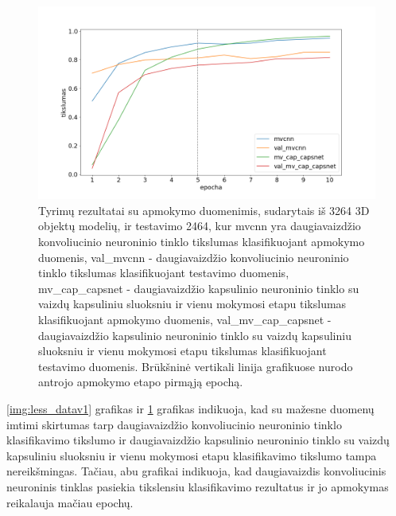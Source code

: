 \begin{figure}[H]
	\centering
	\includegraphics[scale=0.5]{img/less_data_v2.png}
	\caption{
		Tyrimų rezultatai su apmokymo duomenimis, sudarytais iš 3264 3D objektų modelių, ir testavimo 2464, kur mvcnn yra daugiavaizdžio konvoliucinio neuroninio tinklo tikslumas klasifikuojant apmokymo duomenis, val\_mvcnn - daugiavaizdžio konvoliucinio neuroninio tinklo tikslumas klasifikuojant testavimo duomenis, mv\_cap\_capsnet - daugiavaizdžio kapsulinio neuroninio tinklo su vaizdų kapsuliniu sluoksniu ir vienu mokymosi etapu tikslumas klasifikuojant apmokymo duomenis, val\_mv\_cap\_capsnet - daugiavaizdžio kapsulinio neuroninio tinklo su vaizdų kapsuliniu sluoksniu ir vienu mokymosi etapu tikslumas klasifikuojant testavimo duomenis.	Brūkšninė vertikali linija grafikuose nurodo antrojo apmokymo etapo pirmąją epochą.
	}
	\label{img:less_datav2}
\end{figure}

\ref{img:less_datav1} grafikas ir \ref{img:less_datav2} grafikas indikuoja, kad su mažesne duomenų imtimi skirtumas tarp daugiavaizdžio konvoliucinio neuroninio tinklo klasifikavimo tikslumo ir daugiavaizdžio kapsulinio neuroninio tinklo su vaizdų kapsuliniu sluoksniu ir vienu mokymosi etapu klasifikavimo tikslumo tampa nereikšmingas. Tačiau, abu grafikai indikuoja, kad  daugiavaizdis konvoliucinis neuroninis tinklas pasiekia tikslensiu klasifikavimo rezultatus ir jo apmokymas reikalauja mačiau epochų.
